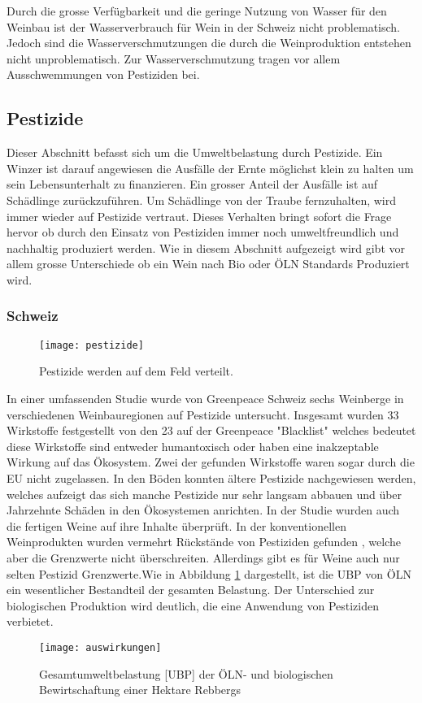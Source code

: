   Durch die grosse Verfügbarkeit und die geringe Nutzung von Wasser für den Weinbau ist der Wasserverbrauch für Wein in der Schweiz nicht problematisch. Jedoch sind die Wasserverschmutzungen die durch die Weinproduktion entstehen nicht unproblematisch. Zur Wasserverschmutzung tragen vor allem Ausschwemmungen von Pestiziden bei.
  \newpage
\subsection{Pestizide}
Dieser Abschnitt befasst sich um die Umweltbelastung durch Pestizide. Ein Winzer ist darauf angewiesen die Ausfälle der Ernte möglichst klein zu halten um sein Lebensunterhalt zu finanzieren. Ein grosser Anteil der Ausfälle ist auf Schädlinge zurückzuführen. Um Schädlinge von der Traube fernzuhalten, wird immer wieder auf Pestizide vertraut. Dieses Verhalten bringt sofort die Frage hervor ob durch den Einsatz von Pestiziden immer noch umweltfreundlich und nachhaltig produziert werden. Wie in diesem Abschnitt aufgezeigt wird gibt vor allem grosse Unterschiede ob ein Wein nach Bio oder ÖLN Standards Produziert wird.
\subsubsection{Schweiz}
\begin{wrapfigure}{r}{10cm}
	\texttt{[image: pestizide]}
	\caption{Pestizide werden auf dem Feld verteilt.}
\end{wrapfigure}
In einer umfassenden Studie wurde von Greenpeace Schweiz sechs Weinberge in verschiedenen Weinbauregionen auf Pestizide untersucht. Insgesamt wurden 33 Wirkstoffe festgestellt von den 23 auf der Greenpeace "Blacklist" welches bedeutet diese Wirkstoffe sind entweder humantoxisch oder haben eine inakzeptable Wirkung auf das Ökosystem. Zwei der gefunden Wirkstoffe waren sogar durch die EU nicht zugelassen. In den Böden konnten ältere Pestizide nachgewiesen werden, welches aufzeigt das sich manche Pestizide nur sehr langsam abbauen und über Jahrzehnte Schäden in den Ökosystemen anrichten. In der Studie wurden auch die fertigen Weine auf ihre Inhalte überprüft. In der konventionellen Weinprodukten wurden vermehrt Rückstände von Pestiziden gefunden , welche aber die Grenzwerte nicht überschreiten. Allerdings gibt es für Weine auch nur selten Pestizid Grenzwerte.Wie in Abbildung \ref{fig:ha} dargestellt, ist die UBP von ÖLN ein wesentlicher Bestandteil der gesamten Belastung. Der Unterschied zur biologischen Produktion wird deutlich, die eine Anwendung von Pestiziden verbietet.
 \begin{figure}[H]	
	\centering
	\texttt{[image: auswirkungen]}
	\caption{Gesamtumweltbelastung [UBP] der ÖLN- und biologischen Bewirtschaftung einer Hektare Rebbergs}
	\label{fig:ha}
\end{figure}

